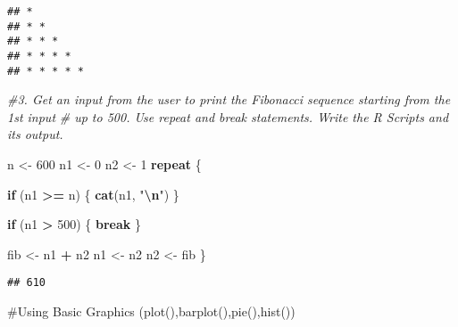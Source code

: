 \documentclass[
]{article}
\newenvironment{Shaded}{\begin{snugshade}}{\end{snugshade}}
\newcommand{\CommentTok}[1]{\textcolor[rgb]{0.56,0.35,0.01}{\textit{#1}}}
\newcommand{\ControlFlowTok}[1]{\textcolor[rgb]{0.13,0.29,0.53}{\textbf{#1}}}
\newcommand{\DecValTok}[1]{\textcolor[rgb]{0.00,0.00,0.81}{#1}}
\newcommand{\FunctionTok}[1]{\textcolor[rgb]{0.13,0.29,0.53}{\textbf{#1}}}
\newcommand{\NormalTok}[1]{#1}
\newcommand{\OtherTok}[1]{\textcolor[rgb]{0.56,0.35,0.01}{#1}}
\newcommand{\SpecialCharTok}[1]{\textcolor[rgb]{0.81,0.36,0.00}{\textbf{#1}}}
\newcommand{\StringTok}[1]{\textcolor[rgb]{0.31,0.60,0.02}{#1}}
\begin{document}
\begin{verbatim}
## * 
## * * 
## * * * 
## * * * * 
## * * * * *
\end{verbatim}

\begin{Shaded}
\begin{Highlighting}[]
\CommentTok{\#3. Get an input from the user to print the Fibonacci sequence starting from the 1st input}
\CommentTok{\# up to 500. Use repeat and break statements. Write the R Scripts and its output.}

\NormalTok{n }\OtherTok{\textless{}{-}} \DecValTok{600}
\NormalTok{n1 }\OtherTok{\textless{}{-}} \DecValTok{0}
\NormalTok{n2 }\OtherTok{\textless{}{-}} \DecValTok{1}
\ControlFlowTok{repeat}\NormalTok{ \{}
  
  \ControlFlowTok{if}\NormalTok{ (n1 }\SpecialCharTok{\textgreater{}=}\NormalTok{ n) \{}
    \FunctionTok{cat}\NormalTok{(n1, }\StringTok{"}\SpecialCharTok{\textbackslash{}n}\StringTok{"}\NormalTok{)}
\NormalTok{  \}}

  
  \ControlFlowTok{if}\NormalTok{ (n1 }\SpecialCharTok{\textgreater{}} \DecValTok{500}\NormalTok{) \{}
    \ControlFlowTok{break}
\NormalTok{  \}}
  
  
\NormalTok{  fib }\OtherTok{\textless{}{-}}\NormalTok{ n1 }\SpecialCharTok{+}\NormalTok{ n2}
\NormalTok{  n1 }\OtherTok{\textless{}{-}}\NormalTok{ n2}
\NormalTok{  n2 }\OtherTok{\textless{}{-}}\NormalTok{ fib}
\NormalTok{\}}
\end{Highlighting}
\end{Shaded}

\begin{verbatim}
## 610
\end{verbatim}

\#Using Basic Graphics (plot(),barplot(),pie(),hist())
\end{document}
